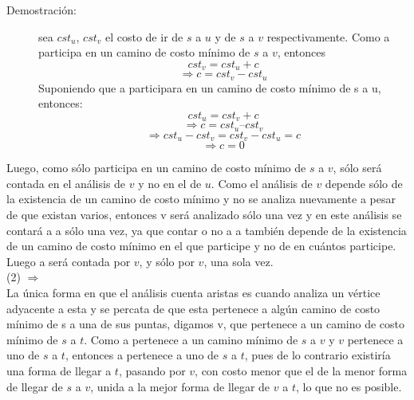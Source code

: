 \documentclass[a4paper,12pt,twocolumn]{article}
\begin{document}
\begin{description}
		\begin{description}
			\item[Demostración:] sea $cst_u$, $cst_v$ el costo de ir de $s$ a $u$ y de $s$ a $v$ respectivamente. Como a participa en un camino de costo mínimo de $s$ a $v$, entonces \\
			$$cst_v = cst_u + c$$
			$$\Rightarrow c = cst_v - cst_u$$
			Suponiendo que a participara en un camino de costo mínimo de s a u, entonces:\\
			$$cst_u = cst_v + c$$
			$$\Rightarrow c = cst_u – cst_v$$
			$$\Rightarrow cst_u - cst_v = cst_v - cst_u = c$$
			$$\Rightarrow c = 0$$
		\end{description} 	
		
		
		Luego, como sólo participa en un camino de costo mínimo de $s$ a $v$, sólo será contada en el análisis de $v$ y no en el de $u$. Como el análisis de $v$ depende sólo de la existencia de un camino de costo mínimo y no se analiza nuevamente a pesar de que existan varios, entonces v será analizado sólo una vez y en este análisis se contará a a sólo una vez, ya que contar o no a a también depende de la existencia de un camino de costo mínimo en el que participe y no de en cuántos participe. Luego a será contada por $v$, y sólo por $v$, una sola vez.\\
		
		(2) $\Rightarrow$ \\
		La única forma en que el análisis cuenta aristas es cuando analiza un vértice adyacente a esta y se percata de que esta pertenece a algún camino de costo mínimo de s a una de sus puntas, digamos v, que pertenece a un camino de costo mínimo de $s$ a $t$. Como a pertenece a un camino mínimo de $s$ a $v$ y $v$ pertenece a uno de $s$ a $t$, entonces a pertenece a uno de $s$ a $t$, pues de lo contrario existiría una forma de llegar a $t$, pasando por $v$, con costo menor que el de la menor forma de llegar de $s$ a $v$, unida a la mejor forma de llegar de $v$ a $t$, lo que no es posible.\\
	\end{description}

	
	
\end{document}
